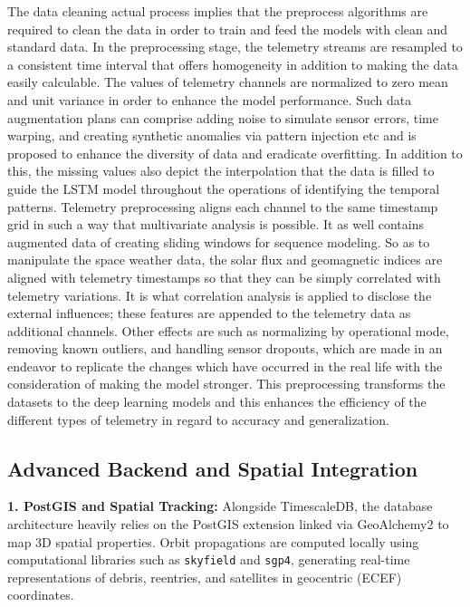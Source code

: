\documentclass[conference]{IEEEtran}
\begin{document}
The data cleaning actual process implies that the preprocess algorithms are required to clean the data in order to train and feed the models with clean and standard data. In the preprocessing stage, the telemetry streams are resampled to a consistent time interval that offers homogeneity in addition to making the data easily calculable. The values of telemetry channels are normalized to zero mean and unit variance in order to enhance the model performance. Such data augmentation plans can comprise adding noise to simulate sensor errors, time warping, and creating synthetic anomalies via pattern injection etc and is proposed to enhance the diversity of data and eradicate overfitting. In addition to this, the missing values also depict the interpolation that the data is filled to guide the LSTM model throughout the operations of identifying the temporal patterns. Telemetry preprocessing aligns each channel to the same timestamp grid in such a way that multivariate analysis is possible. It as well contains augmented data of creating sliding windows for sequence modeling. So as to manipulate the space weather data, the solar flux and geomagnetic indices are aligned with telemetry timestamps so that they can be simply correlated with telemetry variations. It is what correlation analysis is applied to disclose the external influences; these features are appended to the telemetry data as additional channels. Other effects are such as normalizing by operational mode, removing known outliers, and handling sensor dropouts, which are made in an endeavor to replicate the changes which have occurred in the real life with the consideration of making the model stronger. This preprocessing transforms the datasets to the deep learning models and this enhances the efficiency of the different types of telemetry in regard to accuracy and generalization.

\subsection{Advanced Backend and Spatial Integration}

\textbf{1. PostGIS and Spatial Tracking:} Alongside TimescaleDB, the database architecture heavily relies on the PostGIS extension linked via GeoAlchemy2 to map 3D spatial properties. Orbit propagations are computed locally using computational libraries such as \texttt{skyfield} and \texttt{sgp4}, generating real-time representations of debris, reentries, and satellites in geocentric (ECEF) coordinates.
\end{document}
